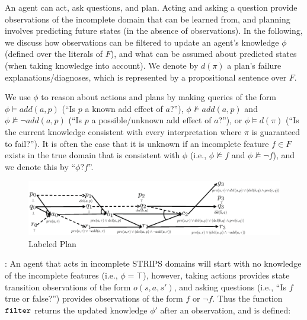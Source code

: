\documentclass[letterpaper]{article}
\def\und#1{\noindent{\bf #1}:}
\begin{document}
An agent can act, ask questions, and plan.  Acting and asking a question provide
observations of the incomplete domain that can be learned from, and planning
involves predicting future states (in the absence of observations).  In the following, we discuss how
observations can be filtered to update an agent's knowledge $\phi$ (defined over
the literals of $F$), and what can be assumed about predicted states
(when taking knowledge into account).  We denote by $d(\pi)$ a plan's failure
explanations/diagnoses, which is represented by a propositional sentence over
$F$.

We use $\phi$ to reason about actions and
plans by making queries of the form $\phi \models
add({a}, p)$ (``Is $p$ a known add effect of
${a}$?''), $\phi \not\models add({a}, p)$ and $\phi
\not \models \neg add({a}, p)$  (``Is $p$ a
possible/unknown add effect of ${a}$?''),  or $\phi \models d(\pi)$ (``Is the
current knowledge consistent with every interpretation where $\pi$ is guaranteed
to fail?'').  It is often the case that it is unknown if an incomplete feature
$f \in F$ exists in the true domain that is consistent with $\phi$ (i.e., $\phi \not\models f$ and $\phi \not\models
\neg f$), and we denote this by ``$\phi?f$''.


\begin{figure}[t]\centering
\includegraphics[width=1\linewidth]{WeberBrycePAL11Fig1.eps}\caption{\label{fig:example}
Labeled Plan}
\end{figure}


\und{Filtering Observations} An agent that acts in incomplete STRIPS domains
will start with no knowledge of the incomplete features (i.e., $\phi = \top$),
however, taking actions provides state transition observations of the form $o(s,
a, s')$, and asking questions (i.e., ``Is $f$ true or false?'') provides
observations of the form $f$ or $\neg f$.  Thus the function ${\tt filter}$
returns the updated knowledge $\phi'$ after an observation, and is
defined:
\end{document}
